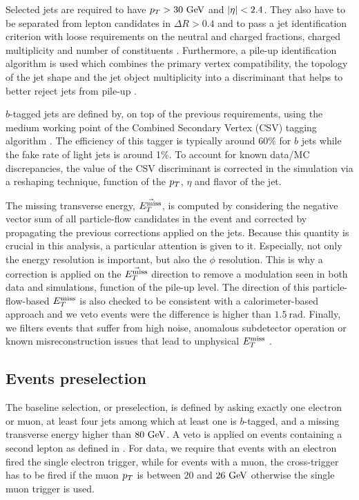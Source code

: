    Selected jets are required to have $p_T > 30 ~\text{GeV}$ and $\left| \eta \right| < 2.4$.  They
   also have to be separated from lepton candidates in $\Delta R > 0.4$ and to
   pass a jet identification criterion with loose requirements on the neutral
   and charged fractions, charged multiplicity and number of constituents
   \cite{JetID}.  Furthermore, a pile-up identification algorithm is used which
   combines the primary vertex compatibility, the topology of the jet shape and
   the jet object multiplicity into a discriminant that helps to better reject
   jets from pile-up \cite{PUJetID}.

   $b$-tagged jets are defined by, on top of the previous requirements, using
   the medium working point of the Combined Secondary Vertex (CSV) tagging
   algorithm \cite{BTagging8TeV}.  The efficiency of this tagger is typically
   around 60\% for $b$ jets while the fake rate of light jets is around 1\%. To
   account for known data/MC discrepancies, the value of the CSV discriminant is
   corrected in the simulation via a reshaping technique, function of the $p_T$,
   $\eta$ and flavor of the jet.

   The missing transverse energy, $\vec{E_T^\text{miss}}$, is computed by considering the
   negative vector sum of all particle-flow candidates in the event and
   corrected by propagating the previous corrections applied on the jets.
   Because this quantity is crucial in this analysis, a particular attention is
   given to it. Especially, not only the energy resolution is important, but
   also the $\phi$ resolution. This is why a correction is applied on the
   $\vec{E_T^\text{miss}}$ direction to remove a modulation seen in both data and
   simulations, function of the pile-up level. The direction of this
   particle-flow-based $E_T^\text{miss}$ is also checked to be consistent with a
   calorimeter-based approach and we veto events were the difference is higher
   than $1.5~\text{rad}$.  Finally, we filters events that suffer from high
   noise, anomalous subdetector operation or known misreconstruction issues that
   lead to unphysical $E_T^\text{miss}$ \cite{METperf}.

    \subsection{Events preselection}

    The baseline selection, or preselection, is defined by asking exactly one
    electron or muon, at least four jets among which at least one is $b$-tagged,
    and a missing transverse energy higher than $80 ~\text{GeV}$.  A veto is applied on
    events containing a second lepton as defined in
    .  For data, we require that events with an
    electron fired the single electron trigger, while for events with a muon,
    the cross-trigger has to be fired if the muon $p_T$ is between $20$ and
    $26~\text{GeV}$ otherwise the single muon trigger is used.

